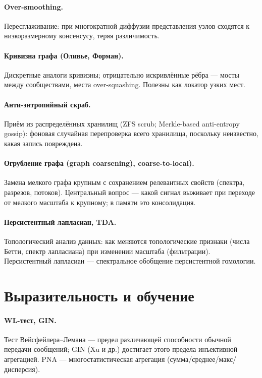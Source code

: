 \paragraph{Over-smoothing.} Пересглаживание: при многократной диффузии
представления узлов сходятся к низкоразмерному консенсусу, теряя
различимость.

\paragraph{Кривизна графа (Оливье, Форман).} Дискретные аналоги кривизны;
отрицательно искривлённые рёбра --- мосты между сообществами, места
over-squashing. Полезны как локатор узких мест.

\paragraph{Анти-энтропийный скраб.} Приём из распределённых хранилищ (ZFS
scrub; Merkle-based anti-entropy gossip): фоновая случайная перепроверка всего
хранилища, поскольку неизвестно, какая запись повреждена.

\paragraph{Огрубление графа (graph coarsening), coarse-to-local).} Замена
мелкого графа крупным с сохранением релевантных свойств (спектра, разрезов,
потоков). Центральный вопрос --- какой сигнал выживает при переходе от
мелкого масштаба к крупному; в памяти это консолидация.

\paragraph{Персистентный лапласиан, TDA.} Топологический анализ данных: как
меняются топологические признаки (числа Бетти, спектр лапласиана) при
изменении масштаба (фильтрации). Персистентный лапласиан --- спектральное
обобщение персистентной гомологии.

\section*{Выразительность и обучение}

\paragraph{WL-тест, GIN.} Тест Вейсфейлера--Лемана --- предел различающей
способности обычной передачи сообщений; GIN (Xu и др.) достигает этого
предела инъективной агрегацией. PNA --- многостатистическая агрегация
(сумма/среднее/макс/дисперсия).

